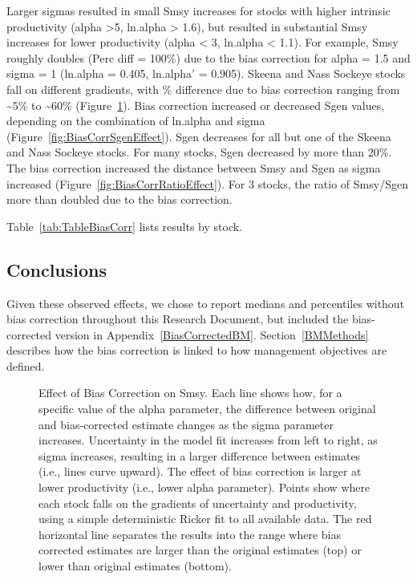 \documentclass[french,11pt]{book}
\begin{document}
Larger sigmas resulted in small Smsy increases for stocks with higher intrinsic productivity (alpha \textgreater5, ln.alpha \textgreater{} 1.6), but resulted in substantial Smsy increases for lower productivity (alpha \textless{} 3, ln.alpha \textless{} 1.1). For example, Smsy roughly doubles (Perc diff = 100\%) due to the bias correction for alpha = 1.5 and sigma = 1 (ln.alpha = 0.405, ln.alpha' = 0.905). Skeena and Nass Sockeye stocks fall on different gradients, with \% difference due to bias correction ranging from \textasciitilde5\% to \textasciitilde60\% (Figure~\ref{fig:BiasCorrSmsyEffect}). Bias correction increased or decreased Sgen values, depending on the combination of ln.alpha and sigma (Figure~\ref{fig:BiasCorrSgenEffect}). Sgen decreases for all but one of the Skeena and Nass Sockeye stocks. For many stocks, Sgen decreased by more than 20\%. The bias correction increased the distance between Smsy and Sgen as sigma increased (Figure~\ref{fig:BiasCorrRatioEffect}). For 3 stocks, the ratio of Smsy/Sgen more than doubled due to the bias correction.

Table~\ref{tab:TableBiasCorr} lists results by stock.

\subsection{Conclusions}\label{conclusions-3}

Given these observed effects, we chose to report medians and percentiles without bias correction throughout this Research Document, but included the bias-corrected version in Appendix~\ref{BiasCorrectedBM}. Section~\ref{BMMethods} describes how the bias correction is linked to how management objectives are defined.

\clearpage


\begin{figure}[htb]

{\centering {} 

}

\caption{Effect of Bias Correction on Smsy. Each line shows how, for a specific value of the alpha parameter, the difference between original and bias-corrected estimate changes as the sigma parameter increases. Uncertainty in the model fit increases from left to right, as sigma increases, resulting in a larger difference between estimates (i.e., lines curve upward). The effect of bias correction is larger at lower productivity (i.e., lower alpha parameter). Points show where each stock falls on the gradients of uncertainty and productivity, using a simple deterministic Ricker fit to all available data. The red horizontal line separates the results into the range where bias corrected estimates are larger than the original estimates (top) or lower than original estimates (bottom).}\label{fig:BiasCorrSmsyEffect}
\end{figure}
\clearpage
\end{document}
